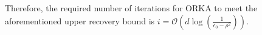 \documentclass[12pt,draftcls,onecolumn]{IEEEtran}
\begin{document}
Therefore, the required number of iterations for ORKA to meet the aforementioned upper recovery bound is $i=\mathcal{O}\left(d\log\left(\frac{1}{\epsilon_0-\rho^2}\right)\right)$. %
\end{document}
